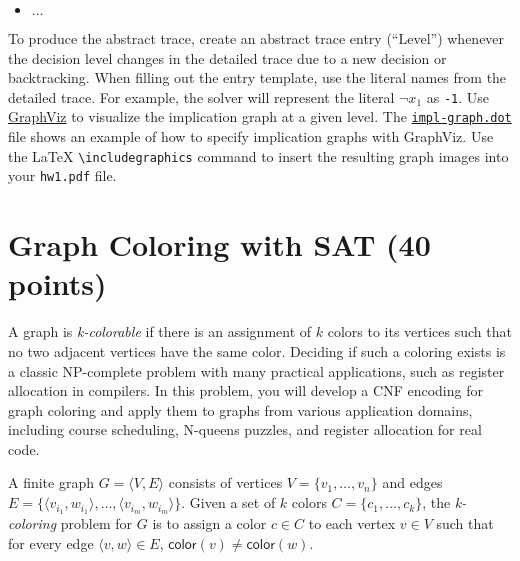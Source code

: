 \documentclass{handout}
\begin{document}
\begin{questions}
\begin{itemize}
\begin{itemize}
  	\end{itemize}
\item $\ldots$
\end{itemize}

To produce the abstract trace, create an abstract trace  entry (``Level'') whenever the decision level changes in the detailed trace due to a new decision or backtracking. When filling out the entry template, use the literal names from the detailed trace. For example, the solver will represent the literal $\neg x_1$ as \texttt{-1}. Use \href{https://www.graphviz.org}{GraphViz} to visualize the implication graph at a given level. The  \href{\gitlabpath/hw1/sat/impl-graph.dot}{\texttt{impl-graph.dot}} file shows an example of how to specify implication graphs with GraphViz. Use the LaTeX \texttt{\textbackslash includegraphics} command to insert the resulting graph images into your \texttt{hw1.pdf} file.





\end{questions}



\pagebreak

\section{Graph Coloring with SAT (40 points)}\label{coloring}

A graph is \emph{k-colorable} if there is an assignment of $k$ colors to its vertices such that no two adjacent vertices have the same color.  Deciding if such a coloring exists is a classic NP-complete problem with many practical applications, such as register allocation in compilers.  In this problem, you will develop a CNF encoding for graph coloring and apply them to graphs from various application domains, including course scheduling, N-queens puzzles, and register allocation for real code.

A finite graph $G = \langle V, E\rangle$ consists of vertices $V=\{v_1,\ldots,v_n\}$ and edges $E=\{\langle v_{i_1}, w_{i_1}\rangle,\ldots,\langle v_{i_m}, w_{i_m}\rangle\}$.  Given a set of $k$ colors $C=\{c_1,\ldots,c_k\}$, the \emph{k-coloring} problem for $G$ is to assign a color $c\in C$  to each vertex $v\in V$ such that for every edge $\langle v,w\rangle\in E$, $\mathsf{color}(v)\neq\mathsf{color}(w)$.
\end{document}
